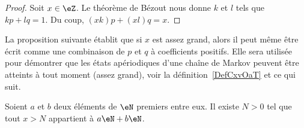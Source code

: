 \begin{proof}
    Soit \( x\in \eZ\). Le théorème de Bézout nous donne \( k\) et \( l\) tels que \( kp+lq=1\). Du coup, \( (xk)p+(xl)q=x\).
\end{proof}

La proposition suivante établit que si \( x\) est assez grand, alors il peut même être écrit comme une combinaison de \( p\) et \( q\) à coefficients positifs. Elle sera utilisée pour démontrer que les états apériodiques d'une chaîne de Markov peuvent être atteints à tout moment (assez grand), voir la définition~\ref{DefCxvOaT} et ce qui suit.

\begin{proposition}     \label{PropLAbRSE}
    Soient \( a\) et \( b\) deux éléments de \( \eN\) premiers entre eux. Il existe \( N>0\) tel que tout \( x>N\) appartient à \( a\eN+b\eN\).
\end{proposition}

